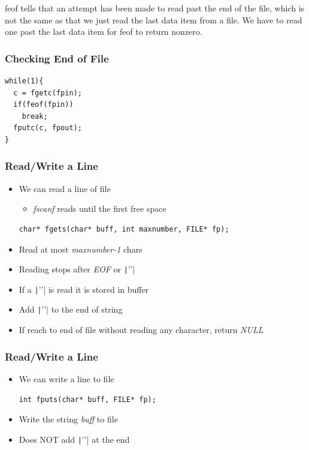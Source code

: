 \documentclass{../c-lecture}
\begin{document}
\begin{frame}
  \begin{block}
    feof tells that an attempt has been made to read past the end of the file,
    which is not the same as that we just read the last data item from a file.
    We have to read one past the last data item for feof to return nonzero.
  \end{block}
\end{frame}

\begin{frame}[fragile]
  \frametitle{Checking End of File}
  \begin{verbatim}
while(1){
  c = fgetc(fpin);
  if(feof(fpin))
    break;
  fputc(c, fpout);
}
  \end{verbatim}
\end{frame}

\begin{frame}[fragile]
  \frametitle{Read/Write a Line}
  \begin{itemize}
    \item We can read a line of file
    \begin{itemize}
      \item
        \textit{\color{LimeGreen} fscanf} reads until the first free space

    \end{itemize}
    \begin{verbatim}
char* fgets(char* buff, int maxnumber, FILE* fp);
    \end{verbatim}
    \item Read at most \textit{\color{YellowOrange} maxnumber-1} chars
    \item
      Reading stops after \textit{\color{Cyan} EOF} or
      \texttt|'\n'|

    \item If a \texttt|'\n'| is read it is stored in buffer
    \item Add \texttt|'\0'| to the end of string
    \item
      If reach to end of file without reading any character, return
      \textit{\color{Cyan} NULL}
  \end{itemize}
\end{frame}

\begin{frame}[fragile]
  \frametitle{Read/Write a Line}
  \begin{itemize}
    \item We can write a line to file
    \begin{verbatim}
int fputs(char* buff, FILE* fp);
    \end{verbatim}
    \item Write the string \textit{\color{YellowOrange} buff} to file
    \item Does \textsc{\color{RubineRed} NOT} add \texttt|'\n'| at the end
  \end{itemize}
\end{frame}
\end{document}
